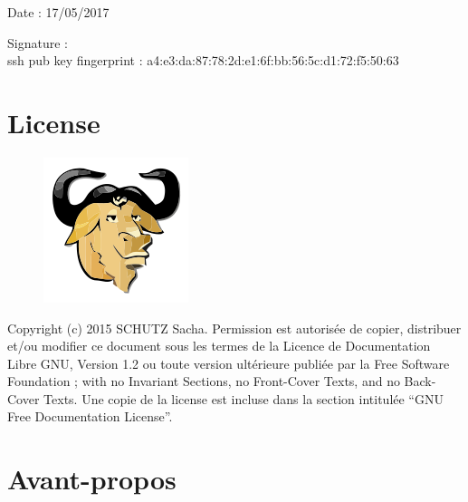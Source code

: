 \documentclass[12pt,a4paper]{article}
\begin{document}
Date : 17/05/2017

\vspace{0.5cm}

Signature : \\

ssh pub key fingerprint : a4:e3:da:87:78:2d:e1:6f:bb:56:5c:d1:72:f5:50:63
\vfill 

\section*{License}

\begin{figure}
\includegraphics[scale=0.5]{img/gfdl.png}\hfill
\end{figure}

Copyright (c) 2015 SCHUTZ Sacha. Permission est autorisée de copier,
distribuer et/ou modifier ce document sous les termes de la Licence de
Documentation Libre GNU, Version 1.2 ou toute version ultérieure publiée
par la Free Software Foundation ; with no Invariant Sections, no
Front-Cover Texts, and no Back-Cover Texts. Une copie de la license est
incluse dans la section intitulée ``GNU Free Documentation License''.

\thispagestyle{empty} 
\setcounter{page}{0}
\thispagestyle{empty} 

\newpage

\tableofcontents
\newpage


\section{Avant-propos}
\end{document}
